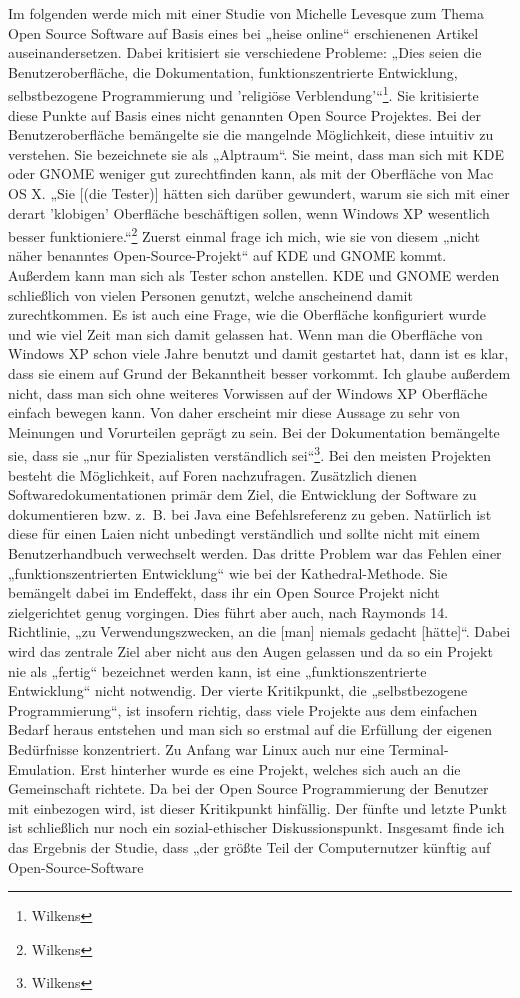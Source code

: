 \documentclass[a4paper,12pt]{article}
\begin{document}
Im folgenden werde mich mit einer Studie von Michelle Levesque zum Thema Open Source Software auf Basis eines bei „heise online“ erschienenen Artikel auseinandersetzen. Dabei kritisiert sie verschiedene Probleme: „Dies seien die Benutzeroberfläche, die Dokumentation, funktionszentrierte Entwicklung, selbstbezogene Programmierung und 'religiöse Verblendung'“\footnote{Wilkens}. Sie kritisierte diese Punkte auf Basis eines nicht genannten Open Source Projektes. Bei der Benutzeroberfläche bemängelte sie die mangelnde Möglichkeit, diese intuitiv zu verstehen. Sie bezeichnete sie als „Alptraum“. Sie meint, dass man sich mit KDE oder GNOME weniger gut zurechtfinden kann, als mit der Oberfläche von Mac OS X. „Sie [(die Tester)] hätten sich darüber gewundert, warum sie sich mit einer derart 'klobigen' Oberfläche beschäftigen sollen, wenn Windows XP wesentlich besser funktioniere.“\footnote{Wilkens} Zuerst einmal frage ich mich, wie sie von diesem „nicht näher benanntes Open-Source-Projekt“ auf KDE und GNOME kommt. Außerdem kann man sich als Tester schon anstellen. KDE und GNOME werden schließlich von vielen Personen genutzt, welche anscheinend damit zurechtkommen. Es ist auch eine Frage, wie die Oberfläche konfiguriert wurde und wie viel Zeit man sich damit gelassen hat. Wenn man die Oberfläche von Windows XP schon viele Jahre benutzt und damit gestartet hat, dann ist es klar, dass sie einem auf Grund der Bekanntheit besser vorkommt. Ich glaube außerdem nicht, dass man sich ohne weiteres Vorwissen auf der Windows XP Oberfläche einfach bewegen kann. Von daher erscheint mir diese Aussage zu sehr von Meinungen und Vorurteilen geprägt zu sein. Bei der Dokumentation bemängelte sie, dass sie „nur für Spezialisten verständlich sei“\footnote{Wilkens}. Bei den meisten Projekten besteht die Möglichkeit, auf Foren nachzufragen. Zusätzlich dienen Softwaredokumentationen primär dem Ziel, die Entwicklung der Software zu dokumentieren bzw. z.~B. bei Java eine Befehlsreferenz zu geben. Natürlich ist diese für einen Laien nicht unbedingt verständlich und sollte nicht mit einem Benutzerhandbuch verwechselt werden. Das dritte Problem war das Fehlen einer „funktionszentrierten Entwicklung“ wie bei der Kathedral-Methode. Sie bemängelt dabei im Endeffekt, dass ihr ein Open Source Projekt nicht zielgerichtet genug vorgingen. Dies führt aber auch, nach Raymonds 14. Richtlinie, „zu Verwendungszwecken, an die [man] niemals gedacht [hätte]“. Dabei wird das zentrale Ziel aber nicht aus den Augen gelassen und da so ein Projekt nie als „fertig“ bezeichnet werden kann, ist eine „funktionszentrierte Entwicklung“ nicht notwendig. Der vierte Kritikpunkt, die „selbstbezogene Programmierung“, ist insofern richtig, dass viele Projekte aus dem einfachen Bedarf heraus entstehen und man sich so erstmal auf die Erfüllung der eigenen Bedürfnisse konzentriert. Zu Anfang war Linux auch nur eine Terminal-Emulation. Erst hinterher wurde es eine Projekt, welches sich auch an die Gemeinschaft richtete. Da bei der Open Source Programmierung der Benutzer mit einbezogen wird, ist dieser Kritikpunkt hinfällig. Der fünfte und letzte Punkt ist schließlich nur noch ein sozial-ethischer Diskussionspunkt. Insgesamt finde ich das Ergebnis der Studie, dass „der größte Teil der Computernutzer künftig auf Open-Source-Software 
\end{document}
